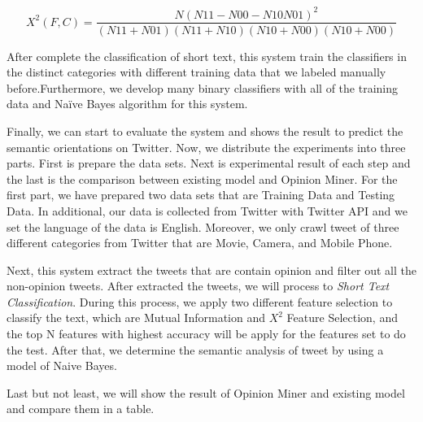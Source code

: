 \documentclass[a4paper,12pt]{article}
\begin{document}
\begin{equation}
X^2(F,C) = \frac{N(N11-N00-N10N01)^2}{(N11+N01)(N11+N10)(N10+N00)(N10+N00)}
\end{equation}\linebreak \par
After complete the classification of short text, this system train the classifiers in the distinct categories with different training data that we labeled manually before.Furthermore, we develop many binary classifiers with all of the training data and Naïve Bayes algorithm for this system.\par
Finally, we can start to evaluate the system and shows the result to predict the semantic orientations on Twitter. Now, we distribute the experiments into three parts. First is prepare the data sets. Next is experimental result of each step and the last is the comparison between existing model and Opinion Miner. For the first part, we have prepared two data sets that are Training Data and Testing Data. In additional, our data is collected from Twitter with Twitter API and we set the language of the data is English. Moreover, we only crawl tweet of three different categories from Twitter that are Movie, Camera, and Mobile Phone.
\par Next, this system extract the tweets that are contain opinion and filter out all the non-opinion tweets. After extracted the tweets, we will process to \textit{Short Text Classification}. During this process, we apply two different feature selection to classify the text, which are Mutual Information and $X^2$ Feature Selection, and the top N features with highest accuracy will be apply for the features set to do the test. After that, we determine the semantic analysis of tweet by using a model of Naive Bayes.
\par Last but not least, we will show the result of Opinion Miner and existing model and compare them in a table.
\end{document}
